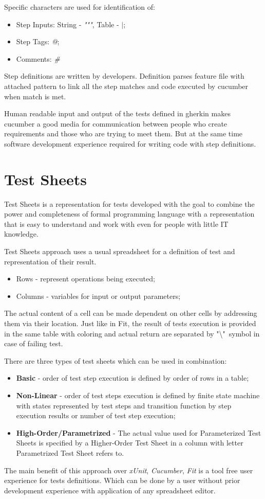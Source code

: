 Specific characters are used for identification of:
\begin{itemize}
	\item Step Inputs: String - \textit{"""}, Table - \textit{$|$};
	\item Step Tags: \textit{@};
	\item Comments: \textit{\#}
\end{itemize}

Step definitions are written by developers. Definition parses feature file with attached pattern to link all the step matches and code executed by cucumber when match is met.

Human readable input and output of the tests defined in gherkin makes cucumber a good media for communication between people who create requirements and those who are trying to meet them. But at the same time software development experience required for writing code with step definitions.

\section{Test Sheets}
\label{sec:testSheets}
Test Sheets is a representation for tests developed with the goal to combine the power and completeness of formal programming language with a representation that is easy to understand and work with even for people with little IT knowledge\cite{ts}.

Test Sheets approach uses a usual spreadsheet for a definition of test and representation of their result. 
\begin{itemize}
	\item Rows - represent operations being executed;
	\item Columns -  variables for input or output parameters;
\end{itemize}

The actual content of a cell can be made dependent on other cells by addressing them via their location.
Just like in Fit, the result of tests execution is provided in the same table with coloring and actual return are separated by "\textbackslash"\ symbol in case of failing test\cite{tsb}.

There are three types of test sheets which can be used in combination:
\begin{itemize}
	\item \textbf{Basic} - order of test step execution is defined by order of rows in a table;
	\item \textbf{Non-Linear} - order of test steps execution is defined by finite state machine with states represented by test steps and transition function by step execution results or number of test step execution;
	\item \textbf{High-Order/Parametrized} - The actual value used for Parameterized Test Sheets is specified by a Higher-Order Test Sheet in a column with letter Parametrized Test Sheet refers to.
\end{itemize}
The main benefit of this approach over \textit{xUnit}, \textit{Cucumber}, \textit{Fit} is a tool free user experience for tests definitions. Which can be done by a user without prior development experience with application of any spreadsheet editor.

